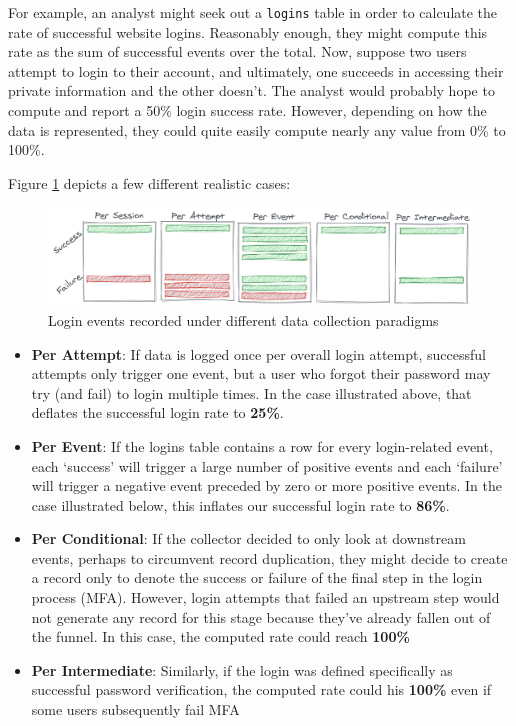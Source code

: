 \documentclass[
]{krantz}
\providecommand{\tightlist}{%
  \setlength{\itemsep}{0pt}\setlength{\parskip}{0pt}}
\begin{document}
For example, an analyst might seek out a \texttt{logins} table in order to calculate the rate of successful website logins.
Reasonably enough, they might compute this rate as the sum of successful events over the total.
Now, suppose two users attempt to login to their account, and ultimately, one succeeds in accessing their private information and the other doesn't.
The analyst would probably hope to compute and report a 50\% login success rate. However, depending on how the data is represented, they could quite easily compute nearly any value from 0\% to 100\%.

Figure \ref{fig:login-rate} depicts a few different realistic cases:

\begin{figure}

{\centering \includegraphics[width=0.9\linewidth]{figures/data-dall/login-rate} 

}

\caption{Login events recorded under different data collection paradigms}\label{fig:login-rate}
\end{figure}

\begin{itemize}
\tightlist
\item
  \textbf{Per Attempt}: If data is logged once per overall login attempt, successful attempts only trigger one event, but a user who forgot their password may try (and fail) to login multiple times. In the case illustrated above, that deflates the successful login rate to \textbf{25\%}.
\item
  \textbf{Per Event}: If the logins table contains a row for every login-related event, each `success' will trigger a large number of positive events and each `failure' will trigger a negative event preceded by zero or more positive events. In the case illustrated below, this inflates our successful login rate to \textbf{86\%}.
\item
  \textbf{Per Conditional}: If the collector decided to only look at downstream events, perhaps to circumvent record duplication, they might decide to create a record only to denote the success or failure of the final step in the login process (MFA). However, login attempts that failed an upstream step would not generate any record for this stage because they've already fallen out of the funnel. In this case, the computed rate could reach \textbf{100\%}
\item
  \textbf{Per Intermediate}: Similarly, if the login was defined specifically as successful password verification, the computed rate could his \textbf{100\%} even if some users subsequently fail MFA
\end{itemize}
\end{document}

